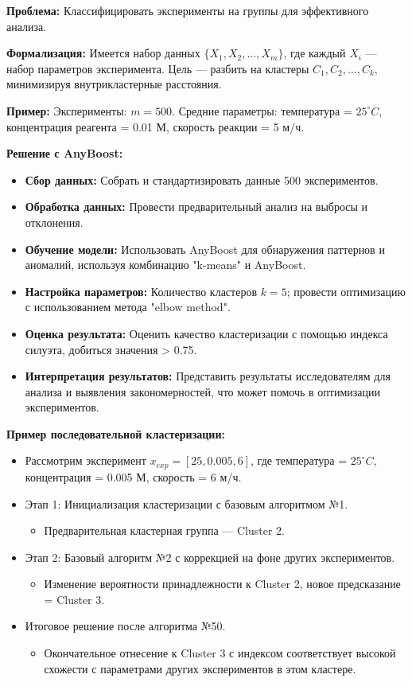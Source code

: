 \textbf{Проблема:} Классифицировать эксперименты на группы для эффективного анализа.

\textbf{Формализация:} 
Имеется набор данных $\{X_1, X_2, \ldots, X_m\}$, где каждый $X_i$ — набор параметров эксперимента. Цель — разбить на кластеры $C_1, C_2, \ldots, C_k$, минимизируя внутрикластерные расстояния.

\textbf{Пример:} 
Эксперименты: $m = 500$. Средние параметры: температура = $25^\circ C$, концентрация реагента = 0.01 М, скорость реакции = 5 м/ч.

\textbf{Решение с AnyBoost:}
\begin{itemize}
    \item \textbf{Сбор данных:} Собрать и стандартизировать данные 500 экспериментов.
    \item \textbf{Обработка данных:} Провести предварительный анализ на выбросы и отклонения.
    \item \textbf{Обучение модели:} Использовать AnyBoost для обнаружения паттернов и аномалий, используя комбинацию "k-means" и AnyBoost.
    \item \textbf{Настройка параметров:} Количество кластеров $k = 5$; провести оптимизацию с использованием метода "elbow method".
    \item \textbf{Оценка результата:} Оценить качество кластеризации с помощью индекса силуэта, добиться значения > 0.75.
    \item \textbf{Интерпретация результатов:} Представить результаты исследователям для анализа и выявления закономерностей, что может помочь в оптимизации экспериментов.
\end{itemize}
\textbf{Пример последовательной кластеризации:}
\begin{itemize}
    \item Рассмотрим эксперимент $x_{exp} = [25, 0.005, 6]$, где температура = $25^\circ C$, концентрация = 0.005 М, скорость = 6 м/ч.
    \item Этап 1: Инициализация кластеризации с базовым алгоритмом №1.
        \begin{itemize}
            \item Предварительная кластерная группа — Cluster 2.
        \end{itemize}
    \item Этап 2: Базовый алгоритм №2 с коррекцией на фоне других экспериментов.
        \begin{itemize}
            \item Изменение вероятности принадлежности к Cluster 2, новое предсказание = Cluster 3.
        \end{itemize}
    \item Итоговое решение после алгоритма №50.
        \begin{itemize}
            \item Окончательное отнесение к Cluster 3 с индексом соответствует высокой схожести с параметрами других экспериментов в этом кластере.
        \end{itemize}
\end{itemize}


